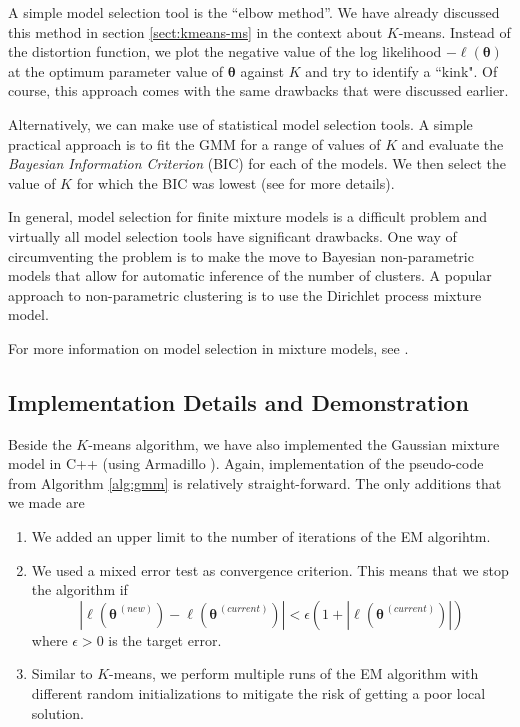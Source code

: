 \documentclass[final,3p,times,twocolumn]{elsarticle}
\let\bs\boldsymbol
\begin{document}
A simple model selection tool is the ``elbow method''.
We have already discussed this method in section \ref{sect:kmeans-ms} in the context about $K$-means.
Instead of the distortion function, we plot the negative value of the log likelihood $-\ell(\bs\theta)$ at the optimum parameter value of $\bs\theta$ against $K$ and try to identify a ``kink".
Of course, this approach comes with the same drawbacks that were discussed earlier.

Alternatively, we can make use of statistical model selection tools.
A simple practical approach is to fit the GMM for a range of values of $K$ and evaluate the \emph{Bayesian Information Criterion} (BIC) for each of the models.
We then select the value of $K$ for which the BIC was lowest (see \cite{fraley2002} for more details).

In general, model selection for finite mixture models is a difficult problem and virtually all model selection tools have significant drawbacks. 
One way of circumventing the problem is to make the move to Bayesian non-parametric models that allow for automatic inference of the number of clusters.
A popular approach to non-parametric clustering is to use the Dirichlet process mixture model.

For more information on model selection in mixture models, see \cite{Murphy}.

\subsection{Implementation Details and Demonstration}
Beside the $K$-means algorithm, we have also implemented the Gaussian mixture model in C++ (using Armadillo \cite{armadillo}).
Again, implementation of the pseudo-code from Algorithm \ref{alg:gmm} is relatively straight-forward.
The only additions that we made are
\begin{enumerate}
\item We added an upper limit to the number of iterations of the EM algorihtm.
\item We used a mixed error test as convergence criterion.
This means that we stop the algorithm if
\begin{equation}
|\ell(\bs\theta^{\,(new)}) - \ell(\bs\theta^{\,(current)})| < \epsilon \left(1 + |\ell(\bs\theta^{\,(current)})|\right)
\end{equation}
where $\epsilon > 0$ is the target error.
\item Similar to $K$-means, we perform multiple runs of the EM algorithm with different random initializations to mitigate the risk of getting a poor local solution.
\end{enumerate}
\end{document}
